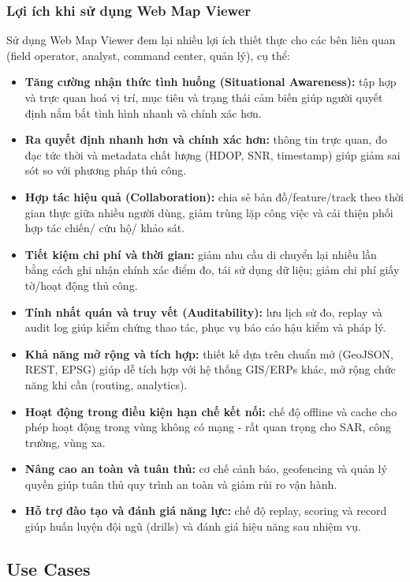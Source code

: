 \begin{itemize}
\subsubsection{Lợi ích khi sử dụng Web Map Viewer}
Sử dụng Web Map Viewer đem lại nhiều lợi ích thiết thực cho các bên liên quan (field operator, analyst, command center, quản lý), cụ thể:
\begin{itemize}
    \item \textbf{Tăng cường nhận thức tình huống (Situational Awareness):} tập hợp và trực quan hoá vị trí, mục tiêu và trạng thái cảm biến giúp người quyết định nắm bắt tình hình nhanh và chính xác hơn.
    \item \textbf{Ra quyết định nhanh hơn và chính xác hơn:} thông tin trực quan, đo đạc tức thời và metadata chất lượng (HDOP, SNR, timestamp) giúp giảm sai sót so với phương pháp thủ công.
    \item \textbf{Hợp tác hiệu quả (Collaboration):} chia sẻ bản đồ/feature/track theo thời gian thực giữa nhiều người dùng, giảm trùng lặp công việc và cải thiện phối hợp tác chiến/ cứu hộ/ khảo sát.
    \item \textbf{Tiết kiệm chi phí và thời gian:} giảm nhu cầu di chuyển lại nhiều lần bằng cách ghi nhận chính xác điểm đo, tái sử dụng dữ liệu; giảm chi phí giấy tờ/hoạt động thủ công.
    \item \textbf{Tính nhất quán và truy vết (Auditability):} lưu lịch sử đo, replay và audit log giúp kiểm chứng thao tác, phục vụ báo cáo hậu kiểm và pháp lý.
    \item \textbf{Khả năng mở rộng và tích hợp:} thiết kế dựa trên chuẩn mở (GeoJSON, REST, EPSG) giúp dễ tích hợp với hệ thống GIS/ERPs khác, mở rộng chức năng khi cần (routing, analytics).
    \item \textbf{Hoạt động trong điều kiện hạn chế kết nối:} chế độ offline và cache cho phép hoạt động trong vùng không có mạng - rất quan trọng cho SAR, công trường, vùng xa.
    \item \textbf{Nâng cao an toàn và tuân thủ:} cơ chế cảnh báo, geofencing và quản lý quyền giúp tuân thủ quy trình an toàn và giảm rủi ro vận hành.
    \item \textbf{Hỗ trợ đào tạo và đánh giá năng lực:} chế độ replay, scoring và record giúp huấn luyện đội ngũ (drills) và đánh giá hiệu năng sau nhiệm vụ.
\end{itemize}
\subsection{Use Cases}

\end{itemize}
